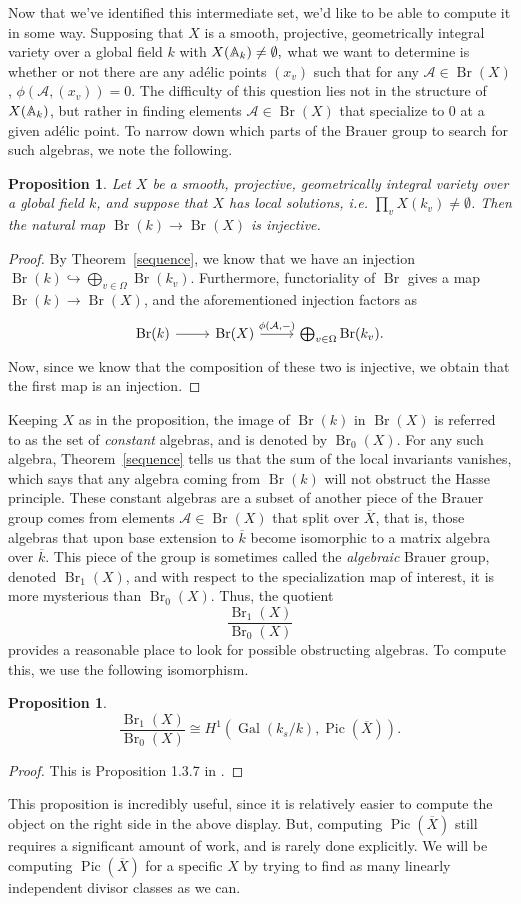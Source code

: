 \documentclass[12pt,twoside]{reedthesis}
\theoremstyle{plain}
\newtheorem{proposition}[theorem]{Proposition}
\theoremstyle{definition}
\theoremstyle{remark}
\newcommand{\Affine}{\mathbb{A}}
\newcommand{\calA}{\mathcal{A}}
\newcommand{\Br}{\operatorname{Br}}
\newcommand{\Pic}{\operatorname{Pic}}
\newcommand{\adele}{\reflectbox{$\Affine$}}
\newcommand{\Gal}{\operatorname{Gal}}
\begin{document}
Now that we've identified this intermediate set, we'd like to be able to compute it in some way. Supposing that $X$ is a smooth, projective, geometrically integral variety over a global field $k$ with $X(\adele_k)\neq\emptyset,$ what we want to determine is whether or not there are any ad\'elic points $(x_v)$ such that for any $\calA\in\Br(X)$, $\phi(\calA,(x_v))=0$. The difficulty of this question lies not in the structure of $X(\adele_k)$, but rather in finding elements $\calA\in\Br(X)$ that specialize to 0 at a given ad\'elic point. To narrow down which parts of the Brauer group to search for such algebras, we note the following.
\begin{proposition}
Let $X$ be a smooth, projective, geometrically integral variety over a global field $k$, and suppose that $X$ has local solutions, i.e. $\prod_v X(k_v)\neq\emptyset$. Then the natural map $\Br(k)\to\Br(X)$ is injective.
\end{proposition}
\begin{proof}
By Theorem~\ref{sequence}, we know that we have an injection $\Br(k)\hookrightarrow\bigoplus_{v\in\Omega}\Br(k_v)$. Furthermore, functoriality of $\Br$ gives a map $\Br(k)\to\Br(X)$, and the aforementioned injection factors as
\[ 
\begin{tikzcd}
\Br(k)\ar{r}&\Br(X)\ar{r}{\phi(\calA,-)}&\bigoplus_{v\in\Omega}\Br(k_v).
\end{tikzcd}
\]
Now, since we know that the composition of these two is injective, we obtain that the first map is an injection.
\end{proof}
\noindent Keeping $X$ as in the proposition, the image of $\Br(k)$ in $\Br(X)$ is referred to as the set of \emph{constant} algebras, and is denoted by $\Br_0(X)$. For any such algebra, Theorem~\ref{sequence} tells us that the sum of the local invariants vanishes, which says that any algebra coming from $\Br(k)$ will not obstruct the Hasse principle. These constant algebras are a subset of another piece of the Brauer group comes from elements $\calA\in\Br(X)$ that split over $\overline{X}$, that is, those algebras that upon base extension to $\overline{k}$ become isomorphic to a matrix algebra over $\overline{k}$. This piece of the group is sometimes called the \emph{algebraic} Brauer group, denoted $\Br_1(X)$, and with respect to the specialization map of interest, it is more mysterious than $\Br_0(X)$. Thus, the quotient \[\frac{\Br_1(X)}{\Br_0(X)}\] provides a reasonable place to look for possible obstructing algebras. To compute this, we use the following isomorphism.
\begin{proposition}
\[
\frac{\Br_1(X)}{\Br_0(X)}\cong H^1(\Gal(k_s/k),\Pic(\overline{X})).
\]
\end{proposition}
\begin{proof}
This is Proposition 1.3.7 in \cite{corn}.
\end{proof}
\noindent This proposition is incredibly useful, since it is relatively easier to compute the object on the right side in the above display. But, computing $\Pic(\overline{X})$ still requires a significant amount of work, and is rarely done explicitly. We will be computing $\Pic(\overline{X})$ for a specific $X$ by trying to find as many linearly independent divisor classes as we can.
\end{document}
